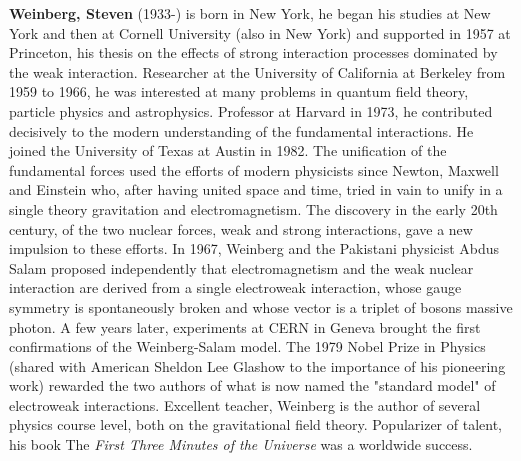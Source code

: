 \textbf{Weinberg, Steven} (1933-) is born in New York, he began his studies at New York and then at Cornell University (also in New York) and supported in 1957 at Princeton, his thesis on the effects of strong interaction processes dominated by the weak interaction. Researcher at the University of California at Berkeley from 1959 to 1966, he was interested at many problems in quantum field theory, particle physics and astrophysics. Professor at Harvard in 1973, he contributed decisively to the modern understanding of the fundamental interactions. He joined the University of Texas at Austin in 1982. The unification of the fundamental forces used the efforts of modern physicists since Newton, Maxwell and Einstein who, after having united space and time, tried in vain to unify in a single theory gravitation and electromagnetism. The discovery in the early 20th century, of the two nuclear forces, weak and strong interactions, gave a new impulsion to these efforts. In 1967, Weinberg and the Pakistani physicist Abdus Salam proposed independently that electromagnetism and the weak nuclear interaction are derived from a single electroweak interaction, whose gauge symmetry is spontaneously broken and whose vector is a triplet of bosons massive photon. A few years later, experiments at CERN in Geneva brought the first confirmations of the Weinberg-Salam model. The 1979 Nobel Prize in Physics (shared with American Sheldon Lee Glashow to the importance of his pioneering work) rewarded the two authors of what is now named the "standard model" of electroweak interactions. Excellent teacher, Weinberg is the author of several physics course level, both on the gravitational field theory. Popularizer of talent, his book The \textit{First Three Minutes of the Universe} was a worldwide success.

